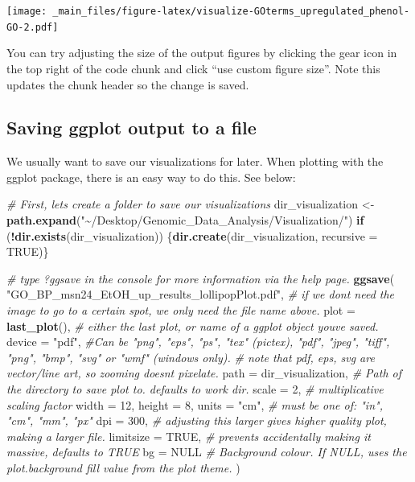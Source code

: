 \documentclass[
]{book}
\newenvironment{Shaded}{\begin{snugshade}}{\end{snugshade}}
\newcommand{\AttributeTok}[1]{\textcolor[rgb]{0.13,0.29,0.53}{#1}}
\newcommand{\CommentTok}[1]{\textcolor[rgb]{0.56,0.35,0.01}{\textit{#1}}}
\newcommand{\ConstantTok}[1]{\textcolor[rgb]{0.56,0.35,0.01}{#1}}
\newcommand{\ControlFlowTok}[1]{\textcolor[rgb]{0.13,0.29,0.53}{\textbf{#1}}}
\newcommand{\DecValTok}[1]{\textcolor[rgb]{0.00,0.00,0.81}{#1}}
\newcommand{\FunctionTok}[1]{\textcolor[rgb]{0.13,0.29,0.53}{\textbf{#1}}}
\newcommand{\NormalTok}[1]{#1}
\newcommand{\OtherTok}[1]{\textcolor[rgb]{0.56,0.35,0.01}{#1}}
\newcommand{\SpecialCharTok}[1]{\textcolor[rgb]{0.81,0.36,0.00}{\textbf{#1}}}
\newcommand{\StringTok}[1]{\textcolor[rgb]{0.31,0.60,0.02}{#1}}
\begin{document}
\texttt{[image: \_main\_files/figure-latex/visualize-GOterms\_upregulated\_phenol-GO-2.pdf]}

You can try adjusting the size of the output figures by clicking the gear icon in the top right of the code chunk and click ``use custom figure size''. Note this updates the chunk header so the change is saved.

\hypertarget{saving-ggplot-output-to-a-file}{%
\subsection{Saving ggplot output to a file}\label{saving-ggplot-output-to-a-file}}

We usually want to save our visualizations for later. When plotting with the ggplot package, there is an easy way to do this. See below:

\begin{Shaded}
\begin{Highlighting}[]
\CommentTok{\# First, let\textquotesingle{}s create a folder to save our visualizations}
\NormalTok{dir\_visualization }\OtherTok{\textless{}{-}} \FunctionTok{path.expand}\NormalTok{(}\StringTok{"\textasciitilde{}/Desktop/Genomic\_Data\_Analysis/Visualization/"}\NormalTok{)}
\ControlFlowTok{if}\NormalTok{ (}\SpecialCharTok{!}\FunctionTok{dir.exists}\NormalTok{(dir\_visualization)) \{}\FunctionTok{dir.create}\NormalTok{(dir\_visualization, }\AttributeTok{recursive =} \ConstantTok{TRUE}\NormalTok{)\}}

\CommentTok{\# type ?ggsave in the console for more information via the help page.}
\FunctionTok{ggsave}\NormalTok{(}
  \StringTok{"GO\_BP\_msn24\_EtOH\_up\_results\_lollipopPlot.pdf"}\NormalTok{, }
  \CommentTok{\# if we don\textquotesingle{}t need the image to go to a certain spot, we only need the file name above.}
  \AttributeTok{plot =} \FunctionTok{last\_plot}\NormalTok{(), }\CommentTok{\# either the last plot, or name of a ggplot object you\textquotesingle{}ve saved.}
  \AttributeTok{device =} \StringTok{"pdf"}\NormalTok{, }\CommentTok{\#Can be "png", "eps", "ps", "tex" (pictex), "pdf", "jpeg", "tiff", "png", "bmp", "svg" or "wmf" (windows only).}
  \CommentTok{\# note that pdf, eps, svg are vector/line art, so zooming doesn\textquotesingle{}t pixelate.}
  \AttributeTok{path =}\NormalTok{ dir\_visualization, }\CommentTok{\# Path of the directory to save plot to. defaults to work dir.}
  \AttributeTok{scale =} \DecValTok{2}\NormalTok{, }\CommentTok{\# multiplicative scaling factor }
  \AttributeTok{width =} \DecValTok{12}\NormalTok{,}
  \AttributeTok{height =} \DecValTok{8}\NormalTok{,}
  \AttributeTok{units =} \StringTok{"cm"}\NormalTok{, }\CommentTok{\# must be one of: "in", "cm", "mm", "px"}
  \AttributeTok{dpi =} \DecValTok{300}\NormalTok{,  }\CommentTok{\# adjusting this larger gives higher quality plot, making a larger file.}
  \AttributeTok{limitsize =} \ConstantTok{TRUE}\NormalTok{, }\CommentTok{\# prevents accidentally making it massive, defaults to TRUE}
  \AttributeTok{bg =} \ConstantTok{NULL} \CommentTok{\# Background colour. If NULL, uses the plot.background fill value from the plot theme.}
\NormalTok{)}
\end{Highlighting}
\end{Shaded}
\end{document}
